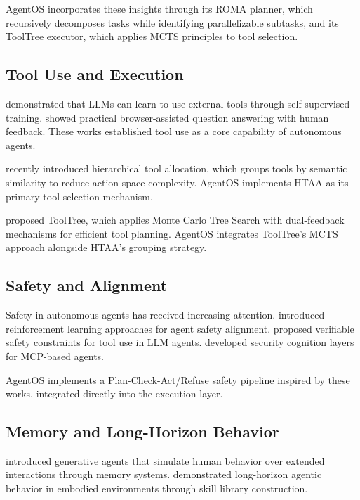 \documentclass[11pt,a4paper]{article}
\begin{document}
AgentOS incorporates these insights through its ROMA planner, which recursively decomposes tasks while identifying parallelizable subtasks, and its ToolTree executor, which applies MCTS principles to tool selection.

\subsection{Tool Use and Execution}

\citet{schick2023toolformer} demonstrated that LLMs can learn to use external tools through self-supervised training. \citet{nakano2021webgpt} showed practical browser-assisted question answering with human feedback. These works established tool use as a core capability of autonomous agents.

\citet{htaa2026} recently introduced hierarchical tool allocation, which groups tools by semantic similarity to reduce action space complexity. AgentOS implements HTAA as its primary tool selection mechanism.

\citet{yang2026tooltree} proposed ToolTree, which applies Monte Carlo Tree Search with dual-feedback mechanisms for efficient tool planning. AgentOS integrates ToolTree's MCTS approach alongside HTAA's grouping strategy.

\subsection{Safety and Alignment}

Safety in autonomous agents has received increasing attention. \citet{sha2025safety} introduced reinforcement learning approaches for agent safety alignment. \citet{doshi2026safe} proposed verifiable safety constraints for tool use in LLM agents. \citet{mcpshield2026} developed security cognition layers for MCP-based agents.

AgentOS implements a Plan-Check-Act/Refuse safety pipeline inspired by these works, integrated directly into the execution layer.

\subsection{Memory and Long-Horizon Behavior}

\citet{park2023generative} introduced generative agents that simulate human behavior over extended interactions through memory systems. \citet{wang2023voyager} demonstrated long-horizon agentic behavior in embodied environments through skill library construction.
\end{document}
